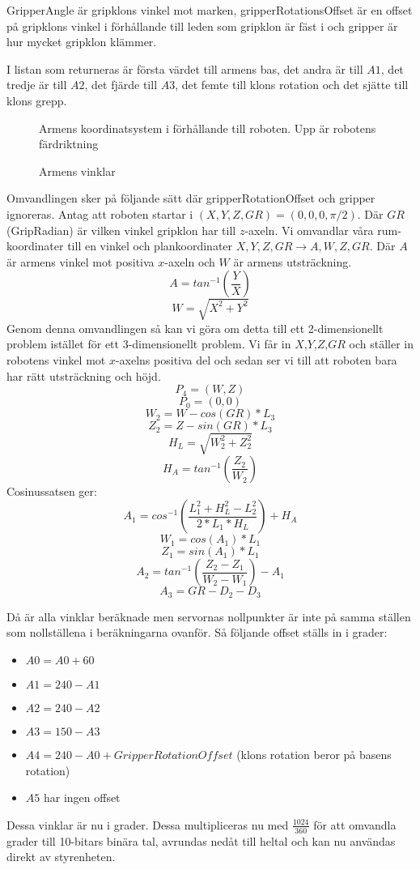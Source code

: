 GripperAngle är gripklons vinkel mot marken, gripperRotationsOffset är en offset på gripklons vinkel i förhållande till leden som gripklon är fäst i och gripper är hur mycket gripklon klämmer.

I listan som returneras är första värdet till armens bas, det andra är till $A1$, det tredje är till $A2$, det fjärde till $A3$, det femte till klons rotation och det sjätte till klons grepp.

\begin{figure}[h!]
	\centerline{}
	\caption{Armens koordinatsystem i förhållande till roboten. Upp är robotens färdriktning}
\end{figure}

\begin{figure}[h!]
	\centerline{}
	\caption{Armens vinklar}
\end{figure}

Omvandlingen sker på följande sätt där gripperRotationOffset och gripper ignoreras. Antag att roboten startar i $(X,Y,Z,GR)=(0,0,0,\pi/2)$.
Där $GR$(GripRadian) är vilken vinkel gripklon har till $z$-axeln.\newline
Vi omvandlar våra rum-koordinater till en vinkel och plankoordinater $X,Y,Z,GR\rightarrow A,W,Z,GR$. Där $A$ är armens vinkel mot positiva $x$-axeln och $W$ är armens utsträckning.
$$A=tan^{-1}(\dfrac{Y}{X}) $$
$$W=\sqrt{X^2+Y^2}$$
Genom denna omvandlingen så kan vi göra om detta till ett 2-dimensionellt problem istället för ett 3-dimensionellt problem. Vi får in $X$,$Y$,$Z$,$GR$ och ställer in robotens vinkel mot $x$-axelns positiva del och sedan ser vi till att roboten bara har rätt utsträckning och höjd.
$$P_4=(W,Z)$$
$$P_0=(0,0)$$
$$W_2=W-cos(GR)*L_3$$
$$Z_2=Z-sin(GR)*L_3$$
$$H_L=\sqrt{W_2^2+Z_2^2}$$
$$H_A=tan^{-1}(\dfrac{Z_2}{W_2})$$
Cosinussatsen ger:
$$A_1=cos^{-1}(\dfrac{L_1^2+H_L^2-L_2^2}{2*L_1*H_L})+H_A$$
$$W_1=cos(A_1)*L_1$$
$$Z_1=sin(A_1)*L_1$$
$$A_2=tan^{-1}(\dfrac{Z_2-Z_1}{W_2-W_1})-A_1$$
$$A_3=GR-D_2-D_3$$

Då är alla vinklar beräknade men servornas nollpunkter är inte på samma ställen som nollställena i beräkningarna ovanför. Så följande offset ställs in i grader:

\begin{itemize}
	\item $A0=A0+60$
	\item $A1=240-A1$
	\item $A2=240-A2$
	\item $A3=150-A3$
	\item $A4=240-A0+GripperRotationOffset$ (klons rotation beror på basens rotation)
	\item $A5$ har ingen offset
\end{itemize}

Dessa vinklar är nu i grader. Dessa multipliceras nu med $\frac{1024}{360}$ för att omvandla grader till 10-bitars binära tal, avrundas nedåt till heltal och kan nu användas direkt av styrenheten.
